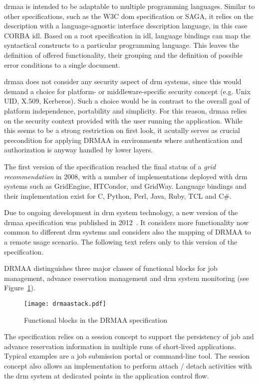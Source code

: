 \documentclass[twocolumn]{svjour3}       %
\begin{document}
\gls{drmaa} is intended to be adaptable to multiple programming languages. Similar to other specifications, such as the W3C \gls{dom} specification or SAGA, it relies on the description with a language-agnostic interface description language, in this case CORBA \gls{idl}. Based on a root specification in \gls{idl}, language bindings can map the syntactical constructs to a particular programming language. This leaves the definition of offered functionality, their grouping and the definition of possible error conditions to a single document.

\gls{drmaa} does not consider any security aspect of \gls{drm} systems, since this would demand a choice for platform- or middleware-specific security concept (e.g. Unix UID, X.509, Kerberos). Such a choice would be in contrast to the overall goal of platform independence, portability and simplicity. For this reason, \gls{drmaa} relies on the security context provided with the user running the application. While this seems to be a strong restriction on first look, it acutally serves as crucial precondition for applying DRMAA in environments where authentication and authorization is anyway handled by lower layers. 

The first version of the specification reached the final status of a \emph{grid recommendation} in 2008, with a number of implementations deployed with \gls{drm} systems such as GridEngine, HTCondor, and GridWay. Language bindings and their implementation exist for C, Python, Perl, Java, Ruby, TCL and C\#. 

Due to ongoing development in \gls{drm} system technology, a new version of the \gls{drmaa} specification was published in 2012~\cite{citemaster_9274}. It considers more functionality now common to different \gls{drm} systems and considers also the mapping of DRMAA to a remote usage scenario. The following text refers only to this version of the specification.

DRMAA distinguishes three major classes of functional blocks for job management, advance reservation management and \gls{drm} system monitoring (see Figure~\ref{fig:drmaastack}).

\begin{figure}
  \texttt{[image: drmaastack.pdf]}
\caption{Functional blocks in the DRMAA specification}
\label{fig:drmaastack} 
\end{figure}

The specification relies on a session concept to support the persistency of job and advance reservation information in multiple runs of short-lived applications. Typical examples are a job submission portal or command-line tool. The session concept also allows an implementation to perform attach / detach activities with the \gls{drm} system at dedicated points in the application control flow.
\end{document}
